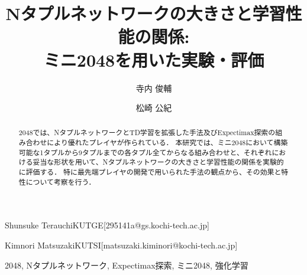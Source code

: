 \documentclass[techrep,submit,noauthor,platex,dvipdfmx]{ipsj}
\begin{document}
\title{Nタプルネットワークの大きさと学習性能の関係:\\ミニ2048を用いた実験・評価}






\author{寺内 俊輔}{Shunsuke Terauchi}{KUTGE}[295141a@gs.kochi-tech.ac.jp]
\author{松崎 公紀}{Kimnori Matsuzaki}{KUTSI}[matsuzaki.kiminori@kochi-tech.ac.jp]

\begin{abstract}
    2048では、NタプルネットワークとTD学習を拡張した手法及びExpectimax探索の組み合わせにより優れたプレイヤが作られている．
    本研究では、ミニ2048において構築可能な1タプルから9タプルまでの各タプル全てからなる組み合わせと、それぞれにおける妥当な形状を用いて、Nタプルネットワークの大きさと学習性能の関係を実験的に評価する．
    特に最先端プレイヤの開発で用いられた手法の観点から、その効果と特性について考察を行う．
\end{abstract}

\begin{jkeyword}
2048, Nタプルネットワーク, Expectimax探索, ミニ2048, 強化学習
\end{jkeyword}


\maketitle






\end{document}
